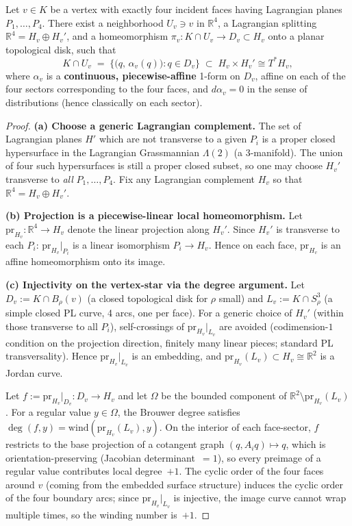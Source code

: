\begin{lemma}\label{lem:q8-vertex-chart}
Let $v\in K$ be a vertex with exactly four incident faces having Lagrangian planes
$P_1,\dots,P_4$. There exist a neighborhood $U_v\ni v$ in $\mathbb R^4$,
a Lagrangian splitting $\mathbb R^4=H_v\oplus H_v'$, and a homeomorphism
$\pi_v\colon K\cap U_v\to D_v\subset H_v$ onto a planar topological disk, such that
\[
K\cap U_v \;=\; \bigl\{\bigl(q,\,\alpha_v(q)\bigr):q\in D_v\bigr\}
\;\subset\; H_v\times H_v'\cong T^*H_v,
\]
where $\alpha_v$ is a \textbf{continuous, piecewise-affine} 1-form on $D_v$,
affine on each of the four sectors corresponding to the four faces,
and $d\alpha_v=0$ in the sense of distributions (hence classically on each sector).
\end{lemma}

\begin{proof}
\textbf{(a) Choose a generic Lagrangian complement.}
The set of Lagrangian planes $H'$ which are not transverse to a given $P_i$ is a proper
closed hypersurface in the Lagrangian Grassmannian $\Lambda(2)$
(a 3-manifold).  The union of four such hypersurfaces is still a proper closed subset,
so one may choose $H_v'$ transverse to \emph{all} $P_1,\dots,P_4$.
Fix any Lagrangian complement $H_v$ so that $\mathbb R^4=H_v\oplus H_v'$.

\textbf{(b) Projection is a piecewise-linear local homeomorphism.}
Let $\mathrm{pr}_{H_v}\colon\mathbb R^4\to H_v$ denote the linear projection along $H_v'$.
Since $H_v'$ is transverse to each $P_i$:
$\mathrm{pr}_{H_v}|_{P_i}$ is a linear isomorphism $P_i\to H_v$.
Hence on each face, $\mathrm{pr}_{H_v}$ is an affine homeomorphism onto its image.

\textbf{(c) Injectivity on the vertex-star via the degree argument.}
Let $D_v:=K\cap B_\rho(v)$ (a closed topological disk for $\rho$ small) and
$L_v:=K\cap S^3_\rho$ (a simple closed PL curve, 4 arcs, one per face).
For a generic choice of $H_v'$ (within those transverse to all $P_i$),
self-crossings of $\mathrm{pr}_{H_v}|_{L_v}$ are avoided
(codimension-$1$ condition on the projection direction, finitely many linear pieces;
standard PL transversality).  Hence $\mathrm{pr}_{H_v}|_{L_v}$ is an embedding,
and $\mathrm{pr}_{H_v}(L_v)\subset H_v\cong\mathbb R^2$ is a Jordan curve.

Let $f:=\mathrm{pr}_{H_v}|_{D_v}\colon D_v\to H_v$ and let $\Omega$ be the bounded
component of $\mathbb R^2\setminus \mathrm{pr}_{H_v}(L_v)$.
For a regular value $y\in\Omega$, the Brouwer degree satisfies
$\deg(f,y)=\mathrm{wind}(\mathrm{pr}_{H_v}(L_v),y)$.
On the interior of each face-sector, $f$ restricts to the base projection of a cotangent
graph $(q,A_iq)\mapsto q$, which is orientation-preserving (Jacobian determinant~$=1$),
so every preimage of a regular value contributes local degree~$+1$.
The cyclic order of the four faces around $v$ (coming from the embedded surface structure)
induces the cyclic order of the four boundary arcs; since $\mathrm{pr}_{H_v}|_{L_v}$ is
injective, the image curve cannot wrap multiple times, so the winding number is~$+1$.


\end{proof}

